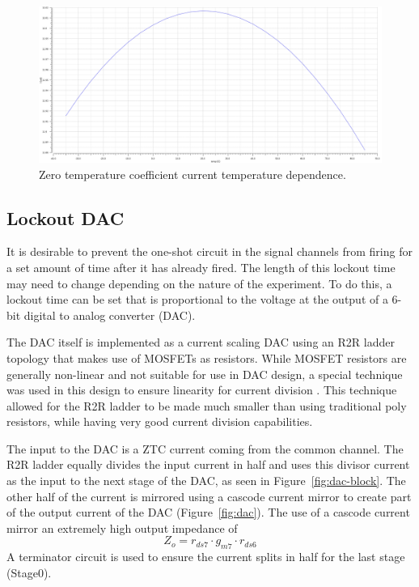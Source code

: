 \documentclass[12pt,oneside,final]{siuethesis}
\theoremstyle{definition}
\begin{document}
\begin{figure}[htbp!]
\centering
\includegraphics[scale=.3,keepaspectratio=true]{../data/ztc.png} 
\caption{Zero temperature coefficient current temperature dependence.}
\label{fig:ztc-temp}
\end{figure}

\subsection{Lockout DAC}
\par It is desirable to prevent the one-shot circuit in the signal channels from firing for a set amount of time after it has already fired. The length of this lockout time may need to change depending on the nature of the experiment. To do this, a lockout time can be set that is proportional to the voltage at the output of a 6-bit digital to analog converter (DAC). 
\par The DAC itself is implemented as a current scaling DAC using an R2R ladder topology that makes use of MOSFETs as resistors. While MOSFET resistors are generally non-linear and not suitable for use in DAC design, a special technique was used in this design to ensure linearity for current division \cite{DAC}. This technique allowed for the R2R ladder to be made much smaller than using traditional poly resistors, while having very good current division capabilities.
\par The input to the DAC is a ZTC current coming from the common channel. The R2R ladder equally divides the input current in half and uses this divisor current as the input to the next stage of the DAC, as seen in Figure~\ref{fig:dac-block}. The other half of the current is mirrored using a cascode current mirror to create part of the output current of the DAC (Figure~\ref{fig:dac}). The use of a cascode current mirror an extremely high output impedance of 
\begin{equation}
Z_{o} = r_{ds7}\cdot g_{m7} \cdot r_{ds6}
\end{equation} 
A terminator circuit is used to ensure the current splits in half for the last stage (Stage0).
\end{document}
